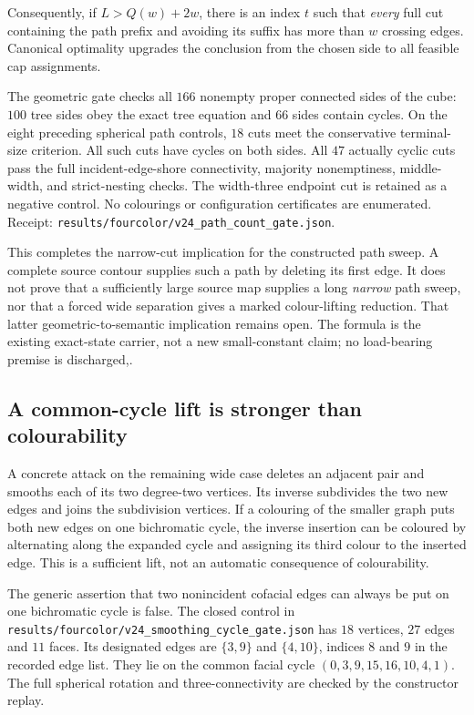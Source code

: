Consequently, if $L>Q(w)+2w$, there is an index $t$ such that
\emph{every} full cut containing the path prefix and avoiding its suffix
has more than $w$ crossing edges. Canonical optimality upgrades the
conclusion from the chosen side to all feasible cap assignments.

The geometric gate checks all $166$ nonempty proper connected sides of
the cube: $100$ tree sides obey the exact tree equation and $66$ sides
contain cycles. On the eight preceding spherical path controls,
$18$ cuts meet the conservative terminal-size criterion. All such cuts
have cycles on both sides. All $47$ actually cyclic cuts pass the full
incident-edge-shore connectivity, majority nonemptiness, middle-width,
and strict-nesting checks. The width-three endpoint cut is retained as
a negative control. No colourings or configuration certificates are
enumerated. Receipt:
\texttt{results/fourcolor/v24\_path\_count\_gate.json}.

This completes the narrow-cut implication for the constructed path
sweep. A complete source contour supplies such a path by deleting its
first edge. It does not prove that a sufficiently large source map
supplies a long \emph{narrow} path sweep, nor that a forced wide
separation gives a marked colour-lifting reduction. That latter
geometric-to-semantic implication remains open. The formula is the
existing exact-state carrier, not a new small-constant claim; no
load-bearing premise is discharged,.

\subsection{A common-cycle lift is stronger than colourability}
\label{sec:smoothing-cycle-obstruction}

A concrete attack on the remaining wide case deletes an adjacent pair
and smooths each of its two degree-two vertices. Its inverse subdivides
the two new edges and joins the subdivision vertices. If a colouring
of the smaller graph puts both new edges on one bichromatic cycle,
the inverse insertion can be coloured by alternating along the expanded
cycle and assigning its third colour to the inserted edge. This is a
sufficient lift, not an automatic consequence of colourability.

The generic assertion that two nonincident cofacial edges can always
be put on one bichromatic cycle is false. The closed control in
\texttt{results/fourcolor/v24\_smoothing\_cycle\_gate.json} has $18$
vertices, $27$ edges and $11$ faces. Its designated edges are
$\{3,9\}$ and $\{4,10\}$, indices $8$ and $9$ in the recorded edge
list. They lie on the common facial cycle
$(0,3,9,15,16,10,4,1)$. The full spherical rotation and
three-connectivity are checked by the constructor replay.


